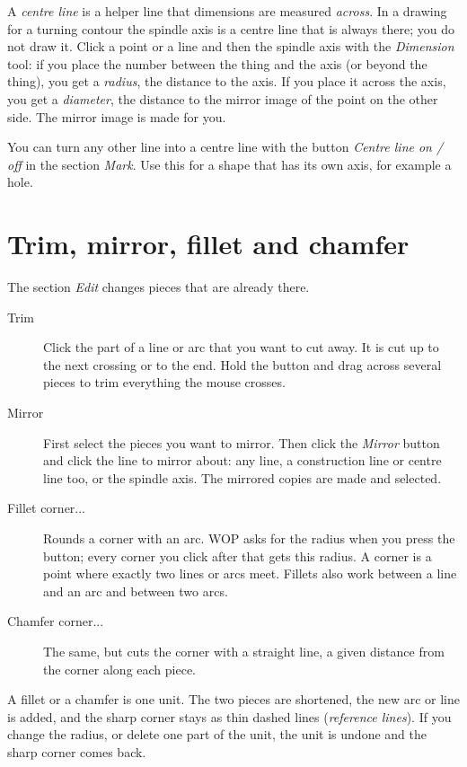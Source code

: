 A \emph{centre line} is a helper line that dimensions are measured \emph{across}. In a drawing for a turning contour the spindle axis is a centre line that is always there; you do not draw it. Click a point or a line and then the spindle axis with the \emph{Dimension} tool: if you place the number between the thing and the axis (or beyond the thing), you get a \emph{radius}, the distance to the axis. If you place it across the axis, you get a \emph{diameter}, the distance to the mirror image of the point on the other side. The mirror image is made for you.

You can turn any other line into a centre line with the button \emph{Centre line on / off} in the section \emph{Mark}. Use this for a shape that has its own axis, for example a hole.

\section{Trim, mirror, fillet and chamfer}\label{sec:sketch:edit}

The section \emph{Edit} changes pieces that are already there.

\begin{description}
\item[Trim] Click the part of a line or arc that you want to cut away. It is cut up to the next crossing or to the end. Hold the button and drag across several pieces to trim everything the mouse crosses.
\item[Mirror] First select the pieces you want to mirror. Then click the \emph{Mirror} button and click the line to mirror about: any line, a construction line or centre line too, or the spindle axis. The mirrored copies are made and selected.
\item[Fillet corner...] Rounds a corner with an arc. WOP asks for the radius when you press the button; every corner you click after that gets this radius. A corner is a point where exactly two lines or arcs meet. Fillets also work between a line and an arc and between two arcs.
\item[Chamfer corner...] The same, but cuts the corner with a straight line, a given distance from the corner along each piece.
\end{description}

A fillet or a chamfer is one unit. The two pieces are shortened, the new arc or line is added, and the sharp corner stays as thin dashed lines (\emph{reference lines}). If you change the radius, or delete one part of the unit, the unit is undone and the sharp corner comes back.

